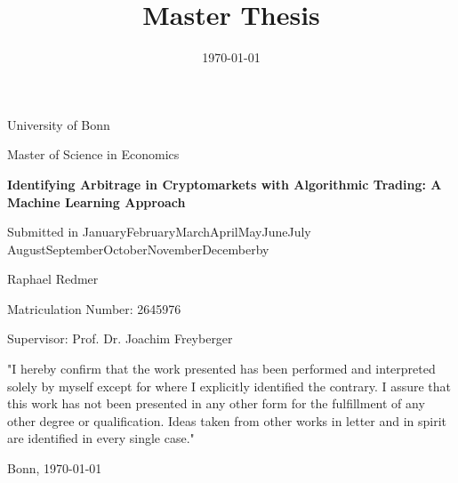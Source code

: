 \documentclass[12pt,a4paper]{scrartcl}
\title{Master Thesis}
\date{\today}
\newcommand*{\printdate}{%
   \ifcase \month\or January\or February\or March\or April\or May\or June\or July\or
    August\or September\or October\or November\or December\fi \space \number\year}
\begin{document}
	\begin{titlepage}
		\centering
		University of Bonn
		
		Master of Science in Economics
		\vspace{1in}
		\vspace{1in}
		\begin{flushleft}
			{\LARGE \bfseries  
				Identifying Arbitrage in Cryptomarkets with Algorithmic Trading: \newline
				\newline
				A Machine Learning Approach}
			\vspace{1in}
		\end{flushleft}
		{\large Submitted in \printdate \space by}
		
		{
			\LARGE Raphael Redmer \par
			\large Matriculation Number: 2645976 \par
		}
		
		\vspace{1in}
		
			Supervisor: Prof. Dr. Joachim Freyberger
			
		\vfill
		
		
	\end{titlepage}
	
	
	
	\newpage	
	\tableofcontents
	\thispagestyle{empty}
	\newpage


	

	

	

	

	

	

	\pagebreak

	\printbibliography

	\pagebreak

	


	\thispagestyle{empty}
	"I hereby confirm that the work presented has been performed and interpreted solely by myself except for where I explicitly identified the contrary. 
	I assure that this work has not been presented in any other form for the fulfillment of any other degree or qualification. 
	Ideas taken from other works in letter and in spirit are identified in every single case."
	\vspace{0.3in}

	\noindent Bonn, \today
\end{document}
